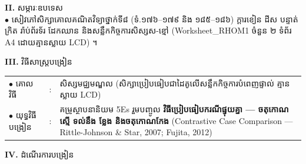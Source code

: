 \documentclass[a4paper,10pt]{article}
\newcommand{\en}[1]{{\TimesEn #1}}
\begin{document}
{\vspace{1pt}

\textbf{II.} {\muol សម្ភារៈឧបទេស}\\[1pt]
\hspace*{0.55cm}$\bullet$ \hspace{0.35cm} សៀវភៅសិក្សាគោលគណិតវិទ្យាថ្នាក់ទី៨ (ទំ.១៧៦--១៧៩ និង ១៨៥--១៨៦) ក្ដារខៀន ដីស បន្ទាត់ក្រិត រ៉ាប់ព័រទ័រ ដែកឈាន និងសន្លឹកកិច្ចការសិស្សស-ខ្មៅ (\en{Worksheet\_RHOM1} ចំនួន ២ ទំព័រ \en{A4} ដោយគ្មានស្លាយ \en{LCD}) ។

\vspace{1pt}

\textbf{III.} {\muol វិធីសាស្រ្តបង្រៀន}\\[1pt]
\hspace*{0.45cm}%
\begin{tabular}{@{}l l L{14.85cm}@{}}
  $\bullet$ \hspace{0.25cm} គោលវិធី & : & សិស្សមជ្ឈមណ្ឌល (សិក្សាប្រៀបធៀបជាដៃគូលើសន្លឹកកិច្ចការបំពេញផ្ទាល់ គ្មានស្លាយ \en{LCD}) \\
  $\bullet$ \hspace{0.25cm} យុទ្ធវិធីបង្រៀន & : & គម្រូស្ថាបនានិយម \en{5Es} រួមបញ្ចូល \textbf{វិធីប្រៀបធៀបករណីផ្ទុយគ្នា — ចតុកោណស្មើ ទល់នឹង ខ្លែង និងចតុកោណកែង} (\en{Contrastive Case Comparison — Rittle-Johnson \& Star, 2007; Fujita, 2012}) \\
\end{tabular}
}

\vspace{1pt}

\textbf{IV.} {\muol ដំណើរការបង្រៀន}

\vspace{1pt}
\end{document}
